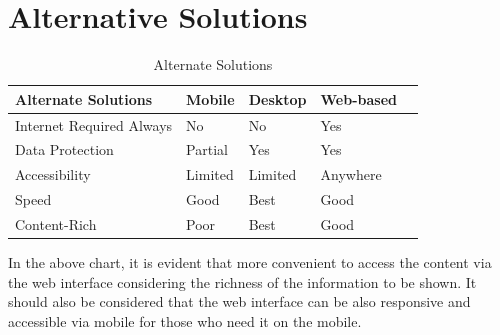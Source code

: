 \documentclass[12pt,a4paper]{report}
\begin{document}
\section{Alternative Solutions}

\begin{table}[h]
\begin{tabular}{|l|l|l|l|l|}
\hline
 \textbf{Alternate Solutions} & \textbf{Mobile}  & \textbf{Desktop}  & \textbf{Web-based}   \\ \hline
 Internet Required Always& No  & No & Yes  \\ \hline
 Data Protection & Partial & Yes & Yes   \\ \hline
 Accessibility & Limited  & Limited & Anywhere   \\ \hline
 Speed & Good  & Best & Good   \\ \hline
 Content-Rich & Poor  & Best & Good   \\ \hline
\end{tabular}
\centering
\caption{Alternate Solutions}
\end{table}
In the above chart, it is evident that more convenient to access the content via the web interface considering the richness of the information to be shown. It should also be considered that the web interface can be also responsive and accessible via mobile for those who need it on the mobile.
\end{document}
